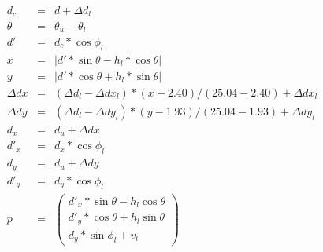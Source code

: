 \documentclass[english]{article}
\begin{document}
\begin{eqnarray}
  d_c &=& d + \Delta d_l \nonumber \\
  \theta &=& \theta_u - \theta_l \nonumber \\
  d' &=& d_c * \cos{\phi_l} \nonumber \\
  x &=& |d' * \sin{\theta} - h_l * \cos{\theta}| \nonumber \\
  y &=& |d' * \cos{\theta} + h_l * \sin{\theta}| \nonumber \\
  \Delta dx &=& (\Delta d_l - \Delta dx_l) * (x - 2.40) / (25.04 - 2.40) + \Delta dx_l \nonumber \\
  \Delta dy &=& (\Delta d_l - \Delta dy_l) * (y - 1.93) / (25.04 - 1.93) + \Delta dy_l \nonumber \\
  d_x &=& d_u + \Delta dx \nonumber \\
  d'_x &=& d_x * \cos{\phi_l} \nonumber \\
  d_y &=& d_u + \Delta dy \nonumber \\
  d'_y &=& d_y * \cos{\phi_l} \nonumber \\
  p &=&  \left(
           \begin{array}{c}
             d'_x * \sin{\theta} - h_l \cos{\theta} \nonumber \\
             d'_y * \cos{\theta} + h_l \sin{\theta} \nonumber \\
             d_y * \sin{\phi_l} + v_l
           \end{array}
         \right)
\end{eqnarray}
\end{document}
